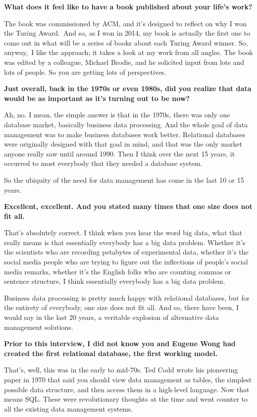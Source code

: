 \documentclass[a4paper,12pt,notitlepage,twoside,openright]{article}
\begin{document}
\textbf{What does it feel like to have a book published about your
life's work?}

The book was commissioned by ACM, and it's designed to reflect on why I
won the Turing Award.~And so, as I won in 2014, my book is actually the
first one to come out in what will be a series of books about each
Turing Award winner. So, anyway,~I like the approach; it takes a look at
my work from all angles. The book was edited by a colleague, Michael
Brodie, and he solicited input from lots and lots of people. So you are
getting lots of perspectives.

\textbf{Just overall, back in the 1970s or even 1980s, did you realize
that data would be as important as it's turning out to be now?}

Ah, no. I mean, the simple answer is that in the 1970s, there was only
one database market, basically business data processing. And the whole
goal of data management was to make business databases work better.
Relational databases were originally designed with that goal in mind,
and that was the only market anyone really saw until around 1990. Then I
think over the next 15 years, it occurred to most everybody that they
needed a database system.

So the ubiquity of the need for data management has come in the last 10
or 15 years.

\textbf{Excellent, excellent. And you stated many times that one size
does not fit all.}

That's absolutely correct. I think when you hear the word big data, what
that really means is that essentially everybody has a big data problem.
Whether it's the scientists who are recording petabytes of experimental
data, whether it's the social media people who are trying to figure out
the inflections of people's social media remarks, whether it's the
English folks who are counting commas or sentence structure, I think
essentially everybody has a big data problem.

Business data processing is pretty much happy with relational databases,
but for the entirety of everybody, one size does not fit all. And so,
there have been, I would say in the last 20 years, a veritable explosion
of alternative data management solutions.

\textbf{Prior to this interview, I did not know you and Eugene Wong had
created the first relational database, the first working model.}

That's, well, this was in the early to mid-70s. Ted Codd wrote his
pioneering paper in 1970 that said you should view data management as
tables, the simplest possible data structure, and then access them in a
high-level language. Now that means SQL. These were revolutionary
thoughts at the time and went counter to all the existing data
management systems.
\end{document}
